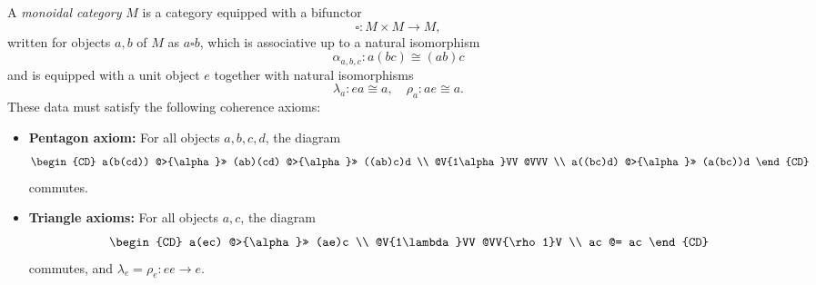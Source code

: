 A \emph{monoidal category} $M$ is a category equipped with a bifunctor
$$\square : M \times M \to M,$$
written for objects $a, b$ of $M$ as $a \square b$, which is associative up to a natural isomorphism
$$\alpha_{a,b,c} : a(bc) \cong (ab)c \tag{1}$$
and is equipped with a unit object $e$ together with natural isomorphisms
$$\lambda_a : ea \cong a, \quad \rho_a : ae \cong a. \tag{2}$$
These data must satisfy the following coherence axioms:
\begin{itemize}
\item \textbf{Pentagon axiom:} For all objects $a,b,c,d$, the diagram
\[
\begin{CD}
a(b(cd)) @>{\alpha}>> (ab)(cd) @>{\alpha}>> ((ab)c)d \\
@V{1\alpha}VV @VVV \\
a((bc)d) @>{\alpha}>> (a(bc))d
\end{CD}
\]
commutes.
\item \textbf{Triangle axioms:} For all objects $a,c$, the diagram
\[
\begin{CD}
a(ec) @>{\alpha}>> (ae)c \\
@V{1\lambda}VV @VV{\rho 1}V \\
ac @= ac
\end{CD}
\]
commutes, and $\lambda_e = \rho_e : ee \to e$.
\end{itemize}
